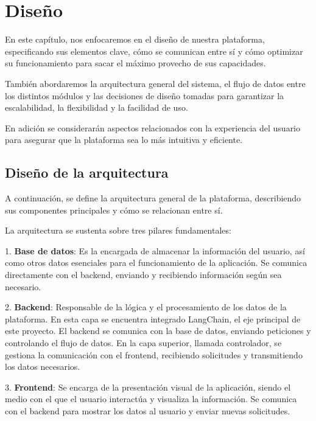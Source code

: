 \chapter{Diseño}

En este capítulo, nos enfocaremos en el diseño de nuestra plataforma, especificando sus elementos clave, cómo se comunican entre sí y cómo optimizar su funcionamiento para sacar el máximo provecho de sus capacidades. 

También abordaremos la arquitectura general del sistema, el flujo de datos entre los distintos módulos y las decisiones de diseño tomadas para garantizar la escalabilidad, la flexibilidad y la facilidad de uso. 

En adición se considerarán aspectos relacionados con la experiencia del usuario para asegurar que la plataforma sea lo más intuitiva y eficiente.  

\newpage



\section{Diseño de la arquitectura}

A continuación, se define la arquitectura general de la plataforma, describiendo sus componentes principales y cómo se relacionan entre sí.

La arquitectura se sustenta sobre tres pilares fundamentales:

1. \textbf{Base de datos}: Es la encargada de almacenar la información del usuario, así como otros datos esenciales para el funcionamiento de la aplicación. Se comunica directamente con el backend, enviando y recibiendo información según sea necesario.

2. \textbf{Backend}: Responsable de la lógica y el procesamiento de los datos de la plataforma. En esta capa se encuentra integrado LangChain, el eje principal de este proyecto. El backend se comunica con la base de datos, enviando peticiones y  controlando el flujo de datos. En la capa superior, llamada controlador, se gestiona la comunicación con el frontend, recibiendo solicitudes y transmitiendo los datos necesarios.

3. \textbf{Frontend}: Se encarga de la presentación visual de la aplicación, siendo el medio con el que el usuario interactúa y visualiza la información. Se comunica con el backend para mostrar los datos al usuario y enviar nuevas solicitudes.

